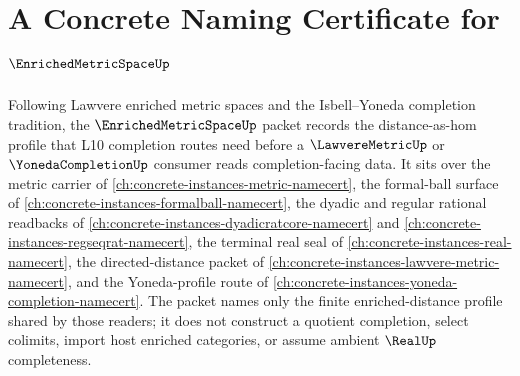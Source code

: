 \chapter{A Concrete Naming Certificate for $\EnrichedMetricSpaceUp$}
\label{ch:concrete-instances-enriched-metric-space-namecert}

Following Lawvere enriched metric spaces and the Isbell--Yoneda completion tradition, the $\EnrichedMetricSpaceUp$ packet records the distance-as-hom profile that L10 completion routes need before a $\LawvereMetricUp$ or $\YonedaCompletionUp$ consumer reads completion-facing data. It sits over the metric carrier of \autoref{ch:concrete-instances-metric-namecert}, the formal-ball surface of \autoref{ch:concrete-instances-formalball-namecert}, the dyadic and regular rational readbacks of \autoref{ch:concrete-instances-dyadicratcore-namecert} and \autoref{ch:concrete-instances-regseqrat-namecert}, the terminal real seal of \autoref{ch:concrete-instances-real-namecert}, the directed-distance packet of \autoref{ch:concrete-instances-lawvere-metric-namecert}, and the Yoneda-profile route of \autoref{ch:concrete-instances-yoneda-completion-namecert}. The packet names only the finite enriched-distance profile shared by those readers; it does not construct a quotient completion, select colimits, import host enriched categories, or assume ambient $\RealUp$ completeness.

